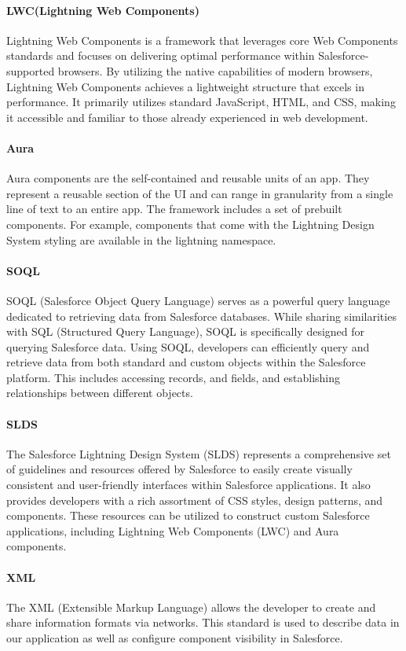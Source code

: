 \paragraph*{LWC(Lightning Web Components)}
Lightning Web Components is a framework that leverages core Web Components standards and focuses on delivering optimal performance within Salesforce-supported browsers. By utilizing the native capabilities of modern browsers, Lightning Web Components achieves a lightweight structure that excels in performance. It primarily utilizes standard JavaScript, HTML, and CSS, making it accessible and familiar to those already experienced in web development.
\paragraph*{Aura}
Aura components are the self-contained and reusable units of an app. They represent a reusable section of the UI and can range in granularity from a single line of text to an entire app.
The framework includes a set of prebuilt components. For example, components that come with the Lightning Design System styling are available in the lightning namespace.\cite{9}
\paragraph*{SOQL}
SOQL (Salesforce Object Query Language) serves as a powerful query language dedicated to retrieving data from Salesforce databases. While sharing similarities with SQL (Structured Query Language), SOQL is specifically designed for querying Salesforce data.
Using SOQL, developers can efficiently query and retrieve data from both standard and custom objects within the Salesforce platform. This includes accessing records, and fields, and establishing relationships between different objects. 
\paragraph*{SLDS}
The Salesforce Lightning Design System (SLDS) represents a comprehensive set of guidelines and resources offered by Salesforce to easily create visually consistent and user-friendly interfaces within Salesforce applications.
It also provides developers with a rich assortment of CSS styles, design patterns, and components. These resources can be utilized to construct custom Salesforce applications, including Lightning Web Components (LWC) and Aura components.
\paragraph*{XML}
The XML (Extensible Markup Language) allows the developer to create and share information formats via networks. This standard is used to describe data in our application as well as configure component visibility in Salesforce.
